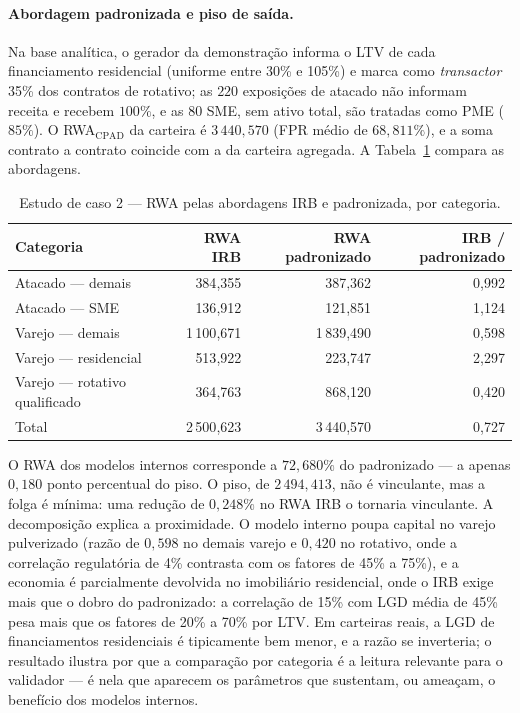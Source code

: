 \documentclass[11pt,a4paper]{article}
\begin{document}
\paragraph{Abordagem padronizada e piso de saída.} Na base analítica, o gerador da demonstração informa o LTV de cada financiamento residencial (uniforme entre 30\% e 105\%) e marca como \emph{transactor} 35\% dos contratos de rotativo; as $220$ exposições de atacado não informam receita e recebem $100\%$, e as $80$ SME, sem ativo total, são tratadas como PME ($85\%$). O RWA$_{\mathrm{CPAD}}$ da carteira é $3\,440{,}570$ (FPR médio de $68{,}811\%$), e a soma contrato a contrato coincide com a da carteira agregada. A Tabela~\ref{tab:irb-cpad} compara as abordagens.

\begin{table}[H]
\centering\small
\caption{Estudo de caso 2 --- RWA pelas abordagens IRB e padronizada, por categoria.}
\label{tab:irb-cpad}
\setlength{\tabcolsep}{4pt}
\begin{tabular}{lrrr}
\toprule
Categoria & RWA IRB & RWA padronizado & IRB / padronizado \\
\midrule
Atacado --- demais & 384{,}355 & 387{,}362 & 0{,}992 \\
Atacado --- SME & 136{,}912 & 121{,}851 & 1{,}124 \\
Varejo --- demais & 1\,100{,}671 & 1\,839{,}490 & 0{,}598 \\
Varejo --- residencial & 513{,}922 & 223{,}747 & 2{,}297 \\
Varejo --- rotativo qualificado & 364{,}763 & 868{,}120 & 0{,}420 \\
\midrule
Total & 2\,500{,}623 & 3\,440{,}570 & 0{,}727 \\
\bottomrule
\end{tabular}
\end{table}

O RWA dos modelos internos corresponde a $72{,}680\%$ do padronizado --- a apenas $0{,}180$ ponto percentual do piso. O piso, de $2\,494{,}413$, não é vinculante, mas a folga é mínima: uma redução de $0{,}248\%$ no RWA IRB o tornaria vinculante. A decomposição explica a proximidade. O modelo interno poupa capital no varejo pulverizado (razão de $0{,}598$ no demais varejo e $0{,}420$ no rotativo, onde a correlação regulatória de 4\% contrasta com os fatores de 45\% a 75\%), e a economia é parcialmente devolvida no imobiliário residencial, onde o IRB exige mais que o dobro do padronizado: a correlação de 15\% com LGD média de 45\% pesa mais que os fatores de 20\% a 70\% por LTV. Em carteiras reais, a LGD de financiamentos residenciais é tipicamente bem menor, e a razão se inverteria; o resultado ilustra por que a comparação por categoria é a leitura relevante para o validador --- é nela que aparecem os parâmetros que sustentam, ou ameaçam, o benefício dos modelos internos.
\end{document}
